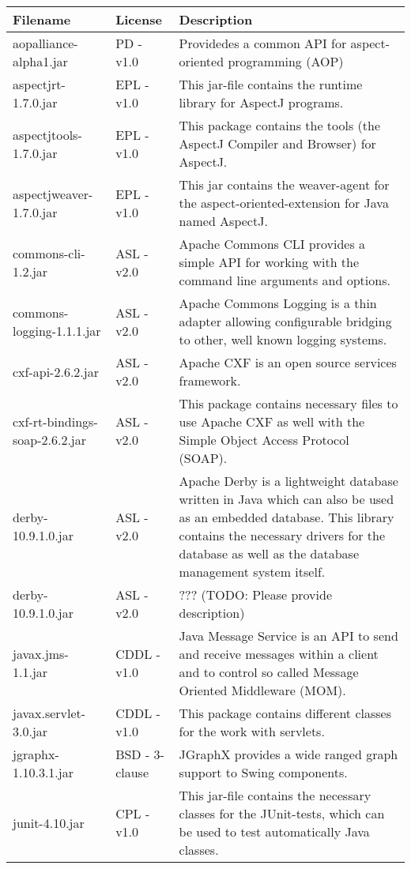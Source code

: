 \begin{center}
\begin{longtable}{|p{}|p{}|p{}|}
\hline 
Filename & License & Description\\
\hline
\hline 
aopalliance-alpha1.jar & PD - v1.0 & Providedes a common API for aspect-oriented programming (AOP)\\
\hline 
aspectjrt-1.7.0.jar & EPL - v1.0 & This jar-file contains the runtime library for AspectJ programs.\\
\hline 
aspectjtools-1.7.0.jar & EPL - v1.0 & This package contains the tools (the AspectJ Compiler and Browser) for AspectJ.\\
\hline 
aspectjweaver-1.7.0.jar & EPL - v1.0 & This jar contains the weaver-agent for the aspect-oriented-extension for Java named AspectJ.\\
\hline 
commons-cli-1.2.jar & ASL - v2.0 & Apache Commons CLI provides a simple API for working with the command line arguments and options.\\
\hline 
commons-logging-1.1.1.jar & ASL - v2.0 & Apache Commons Logging is a thin adapter allowing configurable bridging to other, well known logging systems.\\
\hline 
cxf-api-2.6.2.jar & ASL - v2.0 & Apache CXF is an open source services framework.\\
\hline 
cxf-rt-bindings-soap-2.6.2.jar & ASL - v2.0 & This package contains necessary files to use Apache CXF as well with the Simple Object Access Protocol (SOAP).\\
\hline 
derby-10.9.1.0.jar & ASL - v2.0 & Apache Derby is a lightweight database written in Java which can also be used as an embedded database. This library contains the necessary drivers for the database as well as the database management system itself.\\
\hline 
derby-10.9.1.0.jar & ASL - v2.0 & ??? (TODO: Please provide description)\\
\hline 
javax.jms-1.1.jar & CDDL - v1.0 & Java Message Service is an API to send and receive messages within a client and to control so called Message Oriented Middleware (MOM).\\
\hline 
javax.servlet-3.0.jar & CDDL - v1.0 & This package contains different classes for the work with servlets.\\
\hline 
jgraphx-1.10.3.1.jar & BSD - 3-clause & JGraphX provides a wide ranged graph support to Swing components.\\
\hline 
junit-4.10.jar & CPL - v1.0 & This jar-file contains the necessary classes for the JUnit-tests, which can be used to test automatically Java classes.\\

\end{longtable}
\end{center}
